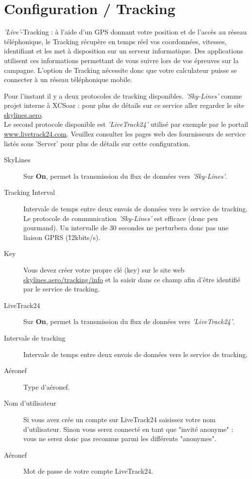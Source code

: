 \section{Configuration / Tracking}

{\it 'Live'}-Tracking : à l'aide d'un GPS donnant votre position et de l'accès au réseau téléphonique, le Tracking récupère en temps réel vos coordonnées, vitesses, identifiant et les met à disposition sur un serveur informatique. Des applications utilisent ces informations permettant de vous suivre lors de vos épreuves sur la campagne. L'option de Tracking nécessite donc que votre calculateur puisse se connecter à un réseau téléphonique mobile. 

Pour l'instant il y a deux protocoles de tracking disponibles. {\it 'Sky-Lines'} comme projet interne à XCSoar : pour plus de détails sur ce service aller regarder le site {\href{https://skylines.aero}{skylines.aero}}.\\
Le second protocole disponible est {\it 'LiveTrack24'} utilisé par exemple par le portail {\href{http://www.livetrack24.com}{www.livetrack24.com}}. Veuillez consulter les pages web des fournisseurs de service listés sous 'Server' pour plus de détails sur cette configuration.

\begin{description}
\item[SkyLines] Sur {\bf On}, permet la transmission du flux de données vers {\it 'Sky-Lines'}.
\item[Tracking Interval] Intervale de temps entre deux envois de données vers le service de tracking. Le protocole de communication {\it 'Sky-Lines'} est efficace (donc peu gourmand). Un intervalle de 30 secondes ne perturbera donc pas une liaison GPRS (\~12kbits/s).
\item[Key] Vous devez créer votre propre clé (key)  sur le site web {\href{https://skylines.aero/tracking/info}{skylines.aero/tracking/info}} et la saisir dans ce champ afin d'être identifié par le service de tracking.
\item[LiveTrack24]Sur {\bf On}, permet la transmission du flux de données vers {\it 'LiveTrack24'}. 
\item[Intervale de tracking] Intervale de temps entre deux envois de données vers le service de tracking. 
\item[Aéronef] Type d'aéronef. 
\item[Nom d'utilisateur] Si vous avez crée un compte sur LiveTrack24 saisissez votre nom d'utilisateur. Sinon vous serez connecté en tant que "invité anonyme" : vous ne serez donc pas reconnus parmi les différents "anonymes".
\item[Aéronef] Mot de passe de votre compte LiveTrack24. 
\end{description}










